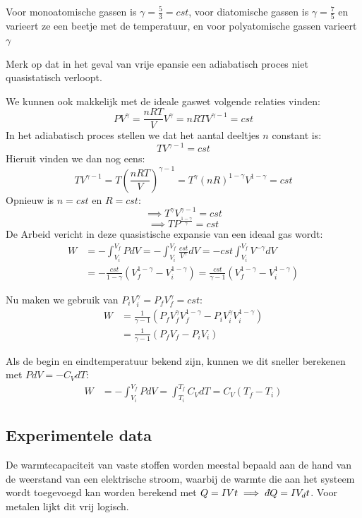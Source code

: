 Voor monoatomische gassen is \(\gamma = \frac{5}{3} = cst\), voor diatomische gassen is \(\gamma = \frac{7}{5}\) en varieert ze een beetje met de temperatuur, en voor polyatomische gassen varieert \(\gamma\)

Merk op dat in het geval van vrije epansie een adiabatisch proces niet quasistatisch verloopt.

We kunnen ook makkelijk met de ideale gaswet volgende relaties vinden:
\[ PV^\gamma = \frac{nRT}{V} V^\gamma = nRTV^{\gamma-1} = cst \]
In het adiabatisch proces stellen we dat het aantal deeltjes \(n\) constant is:
\[TV^{\gamma -1} = cst\]
Hieruit vinden we dan nog eens:
\[TV^{\gamma -1} = T \left( \frac{nRT}{V}\right)^{\gamma-1} = T^{\gamma}(nR)^{1-\gamma} V^{1-\gamma} = cst\]
Opnieuw is \(n = cst\) en \(R = cst\):
\[\implies T^{\gamma}V^{\gamma -1} = cst\]
\[\implies TP^{\frac{1-\gamma}{\gamma}} = cst\]
De Arbeid vericht in deze quasistische expansie van een ideaal gas wordt:
\begin{align*}
    W &= -\int_{V_i}^{V_f} PdV = -\int_{V_i}^{V_f} \frac{cst}{V^\gamma} dV = -cst \int_{V_i}^{V_f} V^{-\gamma} dV \\
    &= -\frac{cst}{1-\gamma} \left( V_f^{1-\gamma} - V_i^{1-\gamma} \right) = \frac{cst}{\gamma - 1} \left( V_f^{1-\gamma} - V_i^{1-\gamma} \right)
\end{align*}

Nu maken we gebruik van \(P_i V_i^\gamma = P_f V_f^\gamma = cst \):
\begin{align*}
    W &= \frac{1}{\gamma - 1} \left( P_f V_f^\gamma V_f^{1-\gamma} - P_i V_i^\gamma V_i^{1-\gamma} \right)\\
    &= \frac{1}{\gamma - 1} (P_f V_f - P_i V_i)
\end{align*}

Als de begin en eindtemperatuur bekend zijn, kunnen we dit sneller berekenen met \(PdV = -C_V dT\):
\begin{align*}
    W &= -\int_{V_i}^{V_f} PdV = \int_{T_i}^{T_f} C_V dT = C_V (T_f - T_i)
\end{align*}

\subsection{Experimentele data}

De warmtecapaciteit van vaste stoffen worden meestal bepaald aan de hand van de weerstand van een elektrische stroom,
waarbij de warmte die aan het systeem wordt toegevoegd kan worden berekend met \(Q = IVt \implies \dbar Q = I V_ dt\).
Voor metalen lijkt dit vrij logisch.


